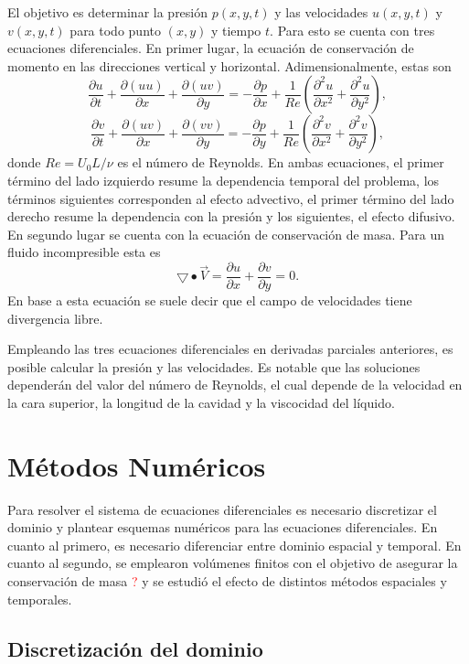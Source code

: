 \documentclass[aps,prb,twocolumn,superscriptaddress,floatfix,longbibliography,10pt]{revtex4-2}
\newif\ifptitle
\newif\ifpnumber
\newcounter{para}
\newcommand\ptitle[1]{\par\refstepcounter{para}
{\ifpnumber{\noindent\textcolor{lightgray}{\textbf{\thepara}}\indent}\fi}
{\ifptitle{\textbf{[{#1}]}}\fi}}
\begin{document}
El objetivo es determinar la presión $p(x,y,t)$ y las velocidades $u(x,y,t)$ y $v(x,y,t)$ para todo punto $(x,y)$ y tiempo $t$. Para esto se cuenta con tres ecuaciones diferenciales. En primer lugar, la ecuación de conservación de momento en las direcciones vertical y horizontal. Adimensionalmente, estas son
\[\frac{\partial u}{\partial t} + \frac{\partial (u u)}{\partial x} + \frac{\partial (u v)}{\partial y} = - \frac{\partial p}{\partial x} + \frac{1}{Re} \left ( \frac{\partial^2 u}{\partial x^2} + \frac{\partial^2 u}{\partial y^2} \right ), \]
\[\frac{\partial v}{\partial t} + \frac{\partial (u v)}{\partial x} + \frac{\partial (v v)}{\partial y} = - \frac{\partial p}{\partial y} + \frac{1}{Re} \left ( \frac{\partial^2 v}{\partial x^2} + \frac{\partial^2 v}{\partial y^2} \right ), \]
donde $Re = U_0L/\nu$ es el número de Reynolds. En ambas ecuaciones, el primer término del lado izquierdo resume la dependencia temporal del problema, los términos siguientes corresponden al efecto advectivo, el primer término del lado derecho resume la dependencia con la presión y los siguientes, el efecto difusivo. En segundo lugar se cuenta con la ecuación de conservación de masa. Para un fluido incompresible esta es
\[\bigtriangledown \bullet \vec{V} = \frac{\partial u}{\partial x} + \frac{\partial v}{\partial y} = 0.  \]
En base a esta ecuación se suele decir que el campo de velocidades tiene divergencia libre.

\ptitle{Resumen}

Empleando las tres ecuaciones diferenciales en derivadas parciales anteriores, es posible calcular la presión y las velocidades. Es notable que las soluciones dependerán del valor del número de Reynolds, el cual depende de la velocidad en la cara superior, la longitud de la cavidad y la viscocidad del líquido.

\section{Métodos Numéricos}

\ptitle{Resumen}
Para resolver el sistema de ecuaciones diferenciales es necesario discretizar el dominio y plantear esquemas numéricos para las ecuaciones diferenciales. En cuanto al primero, es necesario diferenciar entre dominio espacial y temporal. En cuanto al segundo, se emplearon volúmenes finitos con el objetivo de asegurar la conservación de masa \textcolor{red}{?} y se estudió el efecto de distintos métodos espaciales y temporales.

\subsection{Discretización del dominio}
\end{document}
